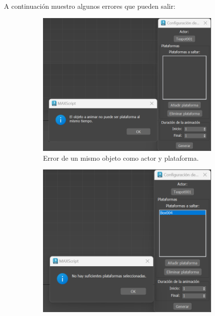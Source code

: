 \bigskip
\newpage

A continuación muestro algunos errores que pueden salir:

\begin{figure}[H]
\begin{subfigure}[t]{0.48\textwidth}
    \centering
    \includegraphics[width=\textwidth]{imagenes/error1.png}
    \caption{Error de un mismo objeto como actor y plataforma.}
 \end{subfigure}
\hfill
 \begin{subfigure}[t]{0.48\textwidth}
    \centering
    \includegraphics[width=\textwidth]{imagenes/error2.png}

\end{subfigure}
\end{figure}
